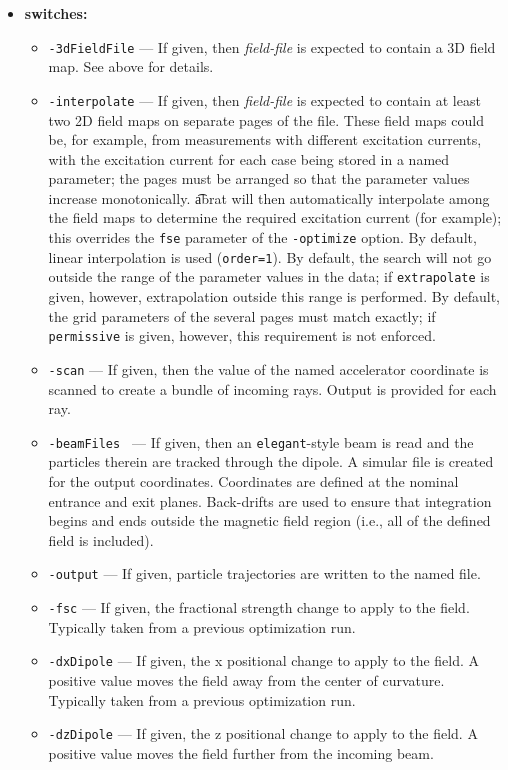 \documentclass[11pt]{article}
\begin{document}
\begin{itemize}
\item {\bf switches:}
\begin{itemize}
\item {\tt -3dFieldFile} --- If given, then {\em field-file} is expected to contain a 3D field map. See above for details.
\item {\tt -interpolate} --- If given, then {\em field-file} is expected to contain at least two 2D field maps on separate
  pages of the file.
  These field maps could be, for example, from measurements with different excitation currents, with the excitation current
  for each case being stored in a named parameter; the pages must be arranged so that the parameter values increase monotonically.
  {\t abrat} will then automatically interpolate among the field maps to determine the required excitation current (for example);
  this overrides the \verb|fse| parameter of the \verb|-optimize| option.
  By default, linear interpolation is used (\verb|order=1|).
  By default, the search will not go outside the range of the parameter values in the data; if \verb|extrapolate| is given, however,
  extrapolation outside this range is performed.
  By default, the grid parameters of the several pages must match exactly; if \verb|permissive| is given, however, this requirement
  is not enforced.
\item {\tt -scan} --- If given, then the value of the named accelerator coordinate is scanned to create a bundle of incoming rays. Output is provided for each  ray.
\item {\tt -beamFiles } --- If given, then an {\tt elegant}-style beam is read and the particles therein are tracked through the dipole.
A simular file is created for the output coordinates. Coordinates are defined at the nominal entrance and exit planes. Back-drifts are used to ensure that
integration begins and ends outside the magnetic field region (i.e., all of the defined field is included).
\item {\tt -output} --- If given, particle trajectories are written to the named file.
\item {\tt -fsc} --- If given, the fractional strength change to apply to the field. Typically taken from a previous optimization run.
\item {\tt -dxDipole} --- If given, the x positional change to apply to the field. A positive value moves the field away from the center of curvature.
  Typically taken from a previous optimization run.
\item {\tt -dzDipole} --- If given, the z positional change to apply to the field. A positive value moves the field further from the incoming beam.

\end{itemize}
\end{itemize}
\end{document}
